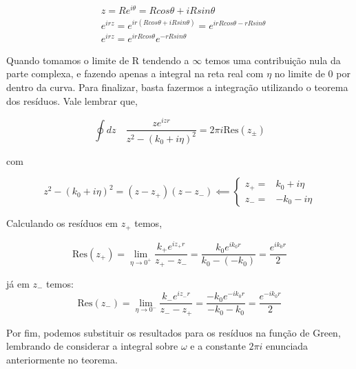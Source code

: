 \begin{equation*}
	\begin{split}
	&z = Re^{i\theta} = Rcos\theta + iRsin\theta \\
	&e^{irz} = e^{ir(Rcos\theta + iRsin\theta)} = e^{irRcos\theta - rRsin\theta}\\
	&e^{irz} = e^{irRcos\theta}e^{-rRsin\theta}
	\end{split}
\end{equation*}

Quando tomamos o limite de R tendendo a $\infty$ temos uma contribuição nula da parte complexa, e fazendo apenas a integral na reta real com $\eta$ no limite de 0 por dentro da curva. Para finalizar, basta fazermos a integração utilizando o teorema dos resíduos. Vale lembrar que,

\begin{equation}
	\oint dz \quad \frac{ze^{izr}}{z^2-(k_0+i\eta)^2} = 2\pi i \text{Res}(z_\pm)
\end{equation}

com

\begin{equation}
	z^2-(k_0+i\eta)^2 = (z-z_+)(z-z_-) \impliedby \begin{cases} 
		z_+ =& k_0 + i\eta \\
		z_- =& -k_0 - i\eta 
	\end{cases}
\end{equation}

Calculando os resíduos em $z_+$ temos,

\begin{equation}
	\text{Res}(z_+) = \lim_{\eta\rightarrow 0^+} \frac{k_+ e^{iz_+r}}{z_+-z_-} = \frac{k_0 e^{ik_0r}}{k_0-(-k_0)} = \frac{e^{ik_0r}}{2}
\end{equation}

já em $z_-$ temos:
\begin{equation}
	\text{Res}(z_-) = \lim_{\eta\rightarrow 0^-} \frac{k_- e^{iz_-r}}{z_--z_+} = \frac{-k_0 e^{-ik_0r}}{-k_0-k_0} = \frac{e^{-ik_0r}}{2}
\end{equation}


Por fim, podemos substituir os resultados para os resíduos na função de Green, lembrando de considerar a integral sobre $\omega$ e a constante $2\pi i$ enunciada anteriormente no teorema.

